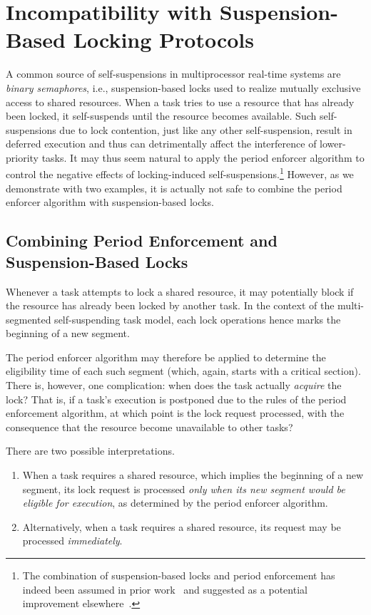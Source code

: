 \section{Incompatibility with Suspension-Based Locking Protocols}
\label{sec:locking}

A common source of self-suspensions in multiprocessor real-time systems are \emph{binary semaphores}, i.e., suspension-based locks used to realize mutually exclusive access to shared resources. When a task tries to use a resource that has already been locked, it self-suspends until the resource becomes available. Such self-suspensions due to lock contention, just like any other self-suspension, result in deferred execution and thus can detrimentally affect the interference of lower-priority tasks. It may thus seem natural to apply the period enforcer algorithm to control the negative effects of locking-induced self-suspensions.\footnote{The combination of suspension-based locks and period enforcement has indeed been assumed in prior work~\cite{Raj:91} and suggested as a potential improvement elsewhere~\cite{Lak:11,LNR:09}.} However, as we demonstrate with two examples, it is actually not safe to combine the period enforcer algorithm with suspension-based locks.

\subsection{Combining Period Enforcement and Suspension-Based Locks}

Whenever a task attempts to lock a shared resource, it may potentially block if the resource has already been  locked by another task. In the context of the multi-segmented self-suspending task model, each lock operations hence marks the beginning of a new segment.

The period enforcer algorithm may therefore be applied to determine the eligibility time of each such segment (which, again, starts with a critical section). There is, however, one complication: when does the task actually \emph{acquire} the lock? That is, if a task's execution is postponed due to the rules of the period enforcement algorithm, at which point is the lock request processed, with the consequence that the resource become unavailable to other tasks? 

There are two possible interpretations.
\begin{enumerate}
	\item When a task requires a shared resource, which implies the beginning of a new segment, its lock request is processed \emph{only when its new segment would be eligible for execution}, as determined by the period enforcer algorithm. 
	\item Alternatively, when a task requires a shared resource, its request may be processed \emph{immediately}.
\end{enumerate}


